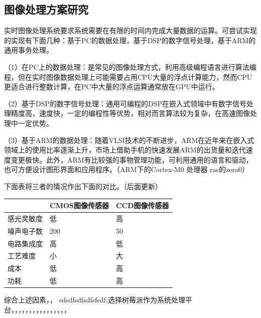 \subsection{图像处理方案研究}
实时图像处理系统要求系统需要在有限的时间内完成大量数据的运算。可尝试实现的实现有下面几种：基于PC的数据处理，基于DSP的数字信号处理，基于ARM的通用事务处理。

（1）在PC上的数据处理：是常见的图像处理方式，利用高级编程语言进行算法编程，但在实时图像数据处理上可能需要占用CPU大量的浮点计算能力，然而CPU更适合进行整数计算，在PC中大量的浮点运算通常放在GPU中运行。

（2）基于DSP的数字信号处理：通用可编程的DSP在嵌入式领域中有数字信号处理精度高，速度快，一定的编程性等优势，相对而言算法较为复杂，在高速图像处理中一定优势。

（3）基于ARM的数据处理：随着VLSI技术的不断进步，ARM在近年来在嵌入式领域上的使用比率逐渐上升，市场上借助手机的快速发展ARM的出货量和迭代速度变更极快。此外，ARM有比较强的事物管理功能，可利用通用的语言和驱动，也可方便设计图形界面和应用程序。（ARM下的Cortex-M0 处理器 ras的zero0）


下面表将三者的情况作出下面的对比。（后面更新）

\begin{table}[h]
	
	\begin{tabular}{|L{2.2cm}|C{4cm}|R{4cm}|}
		\toprule[1pt]
		\hline
		& CMOS图像传感器 & CCD图像传感器 \\ \hline
		感光灵敏度 & 低 & 高 \\ \hline
		噪声电子数 & 200 & 50 \\ \hline
		电路集成度 & 高 & 低 \\ \hline
		工艺难度 & 小 & 大 \\ \hline
		成本 & 低 & 高 \\ \hline
		功耗 & 低 & 高 \\  \hline
	\end{tabular} 
\end{table}

综合上述因素，，
sdsdfsdfsdfsfsdf,选择树莓派作为系统处理平台，，，，，，，，，，，，，，，，


